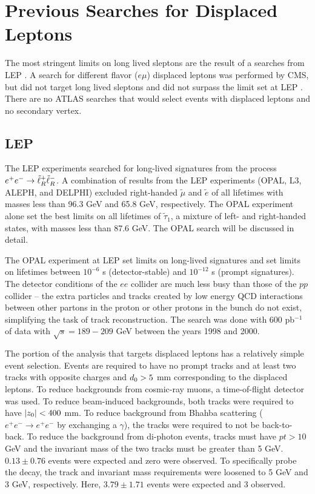 \section{Previous Searches for Displaced Leptons}

The most stringent limits on long lived sleptons are the result of a searches from \ac{LEP} \cite{opal,L3,delphi,aleph,LEP-comb}. A search for different flavor ($e\mu$) displaced leptons was performed by \ac{CMS}, but did not target long lived sleptons and did not surpass the limit set at LEP \cite{cms-dl}. There are no \ac{ATLAS} searches that would select events with displaced leptons and no secondary vertex.

\subsection{LEP}
\label{sec:opal-limit}

The \ac{LEP} experiments searched for long-lived \slep signatures from the process $e^+e^-\rightarrow \tilde{\ell}^+_R \tilde{\ell}^-_R$. A combination of results from the LEP experiments (OPAL, L3, ALEPH, and DELPHI) excluded right-handed $\tilde{\mu}$ and $\tilde{e}$ of all lifetimes with masses less than 96.3 GeV and 65.8 GeV, respectively. The OPAL experiment alone set the best limits on all lifetimes of $\tilde{\tau}_1$, a mixture of left- and right-handed states, with masses less than 87.6 GeV. The OPAL search will be discussed in detail.

The OPAL experiment at \ac{LEP} set limits on long-lived \slep signatures and set limits on \slep lifetimes between $10^{-6}$ s (detector-stable) and $10^{-12}$ s (prompt signatures). The detector conditions of the $ee$ collider are much less busy than those of the $pp$ collider -- the extra particles and tracks created by low energy \ac{QCD} interactions between other partons in the proton or other protons in the bunch do not exist, simplifying the task of track reconstruction. The search was done with 600 pb$^{-1}$ of data with $\sqrt{s} = 189 - 209$ GeV between the years 1998 and 2000.

The portion of the analysis that targets displaced leptons has a relatively simple event selection. Events are required to have no prompt tracks and at least two tracks with opposite charges and $d_0 > 5$ mm corresponding to the displaced leptons. To reduce backgrounds from cosmic-ray muons, a time-of-flight detector was used. To reduce beam-induced backgrounds, both tracks were required to have $|z_0| < 400$ mm. To reduce background from Bhahba scattering ($e^+e^- \rightarrow e^+e^-$ by exchanging a $\gamma$), the tracks were required to not be back-to-back. To reduce the background from di-photon events, tracks must have $pt > 10$ GeV and the invariant mass of the two tracks must be greater than 5 GeV. $0.13 \pm 0.76$ events were expected and zero were observed. To specifically probe the \stau decay, the track \pt and invariant mass requirements were loosened to 5 GeV and 3 GeV, respectively. Here, $3.79 \pm 1.71$ events were expected and 3 observed.

